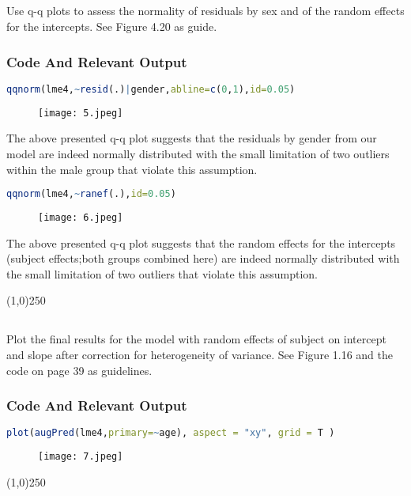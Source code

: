\documentclass[a4paper]{article}
\begin{document}
\subsection{}Use q-q plots to assess the normality of residuals by sex and of the random effects for the intercepts. See Figure 4.20 as guide.
\subsubsection{Code And Relevant Output}
\begin{lstlisting}[language=R]
qqnorm(lme4,~resid(.)|gender,abline=c(0,1),id=0.05)
\end{lstlisting}

\begin{figure}[H]
\centering
\texttt{[image: 5.jpeg]}\\
\end{figure}
The above presented q-q plot suggests that the residuals by gender from our model are indeed normally distributed with the small limitation of two outliers within the male group that violate this assumption. 
\begin{lstlisting}[language=R]
qqnorm(lme4,~ranef(.),id=0.05)
\end{lstlisting}

\begin{figure}[H]
\centering
\texttt{[image: 6.jpeg]}\\
\end{figure}
The above presented q-q plot suggests that the random effects for the intercepts (subject effects;both groups combined here) are indeed normally distributed with the small limitation of two outliers that violate this assumption.
\begin{center}
\line(1,0){250}
\end{center}
\pagebreak

\subsection{}Plot the final results for the model with random effects of subject on intercept and slope after correction for heterogeneity of variance. See Figure 1.16 and the code on page 39 as guidelines.
\subsubsection{Code And Relevant Output}
\begin{lstlisting}[language=R]
plot(augPred(lme4,primary=~age), aspect = "xy", grid = T )
\end{lstlisting}

\begin{figure}[H]
\centering
\texttt{[image: 7.jpeg]}\\
\end{figure}
\begin{center}
\line(1,0){250}
\end{center}
\end{document}
